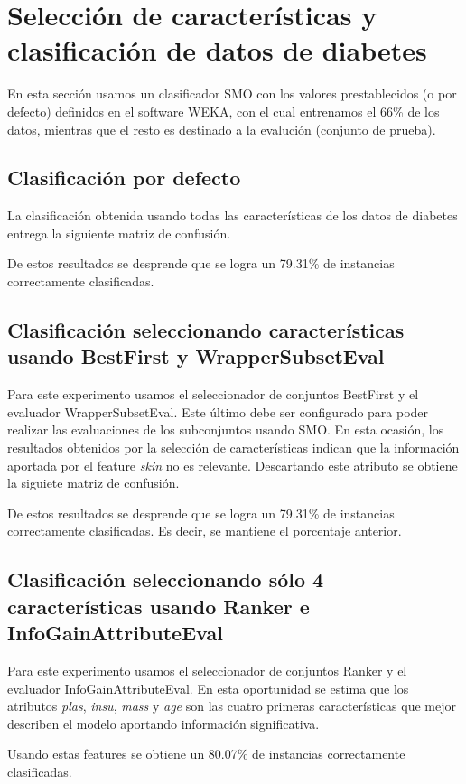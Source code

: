 \section{Selecci\'on de caracter\'isticas y clasificaci\'on de datos de diabetes}

En esta secci\'on usamos un clasificador SMO con los valores prestablecidos (o por defecto) definidos en el software WEKA, con el cual entrenamos el 66\% de los datos, mientras que el resto es destinado a la evaluci\'on (conjunto de prueba).

\subsection{Clasificaci\'on por defecto}
La clasificaci\'on obtenida usando todas las caracter\'isticas de los datos de diabetes entrega la siguiente matriz de confusi\'on.
\begin{center}

\end{center}

De estos resultados se desprende que se logra un 79.31\% de instancias correctamente clasificadas. 
\subsection{Clasificaci\'on seleccionando caracter\'isticas usando BestFirst y WrapperSubsetEval}
Para este experimento usamos el seleccionador de conjuntos BestFirst y el evaluador WrapperSubsetEval. Este \'ultimo debe ser configurado para poder realizar las evaluaciones de los  subconjuntos usando SMO. En esta ocasi\'on, los resultados obtenidos por la selecci\'on de caracter\'isticas indican que la informaci\'on aportada por el feature \textit{skin} no es relevante. Descartando este atributo se obtiene la siguiete matriz de confusi\'on. 
\begin{center}

\end{center}
De estos resultados se desprende que se logra un 79.31\% de instancias correctamente clasificadas. Es decir, se mantiene el porcentaje anterior.
\subsection{Clasificaci\'on seleccionando s\'olo 4 caracter\'isticas usando Ranker e InfoGainAttributeEval}
Para este experimento usamos el seleccionador de conjuntos Ranker y el evaluador InfoGainAttributeEval.  En esta oportunidad se estima que los atributos \textit{plas}, \textit{insu}, \textit{mass} y \textit{age}  son las cuatro primeras caracter\'isticas que mejor  describen el modelo aportando informaci\'on significativa.
\begin{center}

\end{center}
Usando estas features se obtiene un 80.07\% de instancias correctamente clasificadas.
